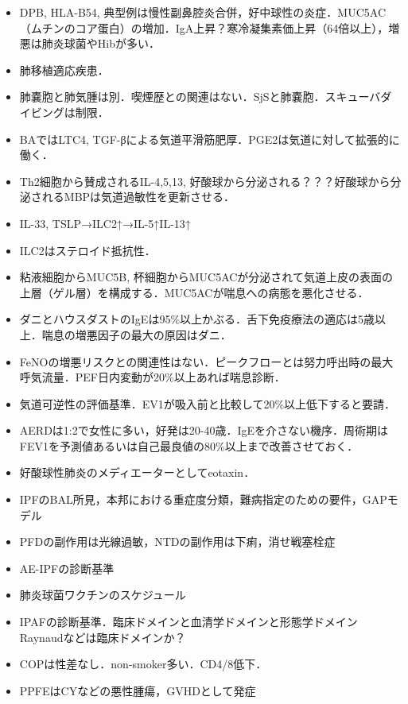 \begin{itemize}
\item DPB, HLA-B54, 典型例は慢性副鼻腔炎合併，好中球性の炎症．MUC5AC（ムチンのコア蛋白）の増加．IgA上昇？寒冷凝集素価上昇（64倍以上），増悪は肺炎球菌やHibが多い．


\item 肺移植適応疾患．
\item 肺嚢胞と肺気腫は別．喫煙歴との関連はない．SjSと肺嚢胞．スキューバダイビングは制限．

\item BAではLTC4, TGF-βによる気道平滑筋肥厚．PGE2は気道に対して拡張的に働く．
\item Th2細胞から賛成されるIL-4,5,13, 好酸球から分泌される？？？好酸球から分泌されるMBPは気道過敏性を更新させる．
\item IL-33, TSLP→ILC2↑→IL-5↑IL-13↑
\item ILC2はステロイド抵抗性．
\item 粘液細胞からMUC5B, 杯細胞からMUC5ACが分泌されて気道上皮の表面の上層（ゲル層）を構成する．MUC5ACが喘息への病態を悪化させる．
\item ダニとハウスダストのIgEは95\%以上かぶる．舌下免疫療法の適応は5歳以上．喘息の増悪因子の最大の原因はダニ．
\item FeNOの増悪リスクとの関連性はない．ピークフローとは努力呼出時の最大呼気流量．PEF日内変動が20\%以上あれば喘息診断．
\item 気道可逆性の評価基準．EV1が吸入前と比較して20\%以上低下すると要請．

\item AERDは1:2で女性に多い，好発は20-40歳．IgEを介さない機序．周術期はFEV1を予測値あるいは自己最良値の80\%以上まで改善させておく．

\item 好酸球性肺炎のメディエーターとしてeotaxin．

\item IPFのBAL所見，本邦における重症度分類，難病指定のための要件，GAPモデル
\item PFDの副作用は光線過敏，NTDの副作用は下痢，消せ戦塞栓症

\item AE-IPFの診断基準
\item 肺炎球菌ワクチンのスケジュール

\item IPAFの診断基準．臨床ドメインと血清学ドメインと形態学ドメイン Raynaudなどは臨床ドメインか？
\item COPは性差なし．non-smoker多い．CD4/8低下．
\item PPFEはCYなどの悪性腫瘍，GVHDとして発症


\end{itemize}
